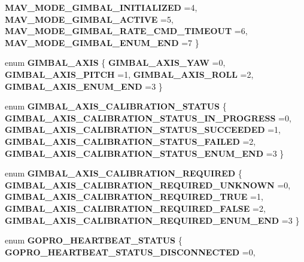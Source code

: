 \begin{DoxyCompactItemize}
\newline
\textbf{ M\+A\+V\+\_\+\+M\+O\+D\+E\+\_\+\+G\+I\+M\+B\+A\+L\+\_\+\+I\+N\+I\+T\+I\+A\+L\+I\+Z\+ED} =4, 
\textbf{ M\+A\+V\+\_\+\+M\+O\+D\+E\+\_\+\+G\+I\+M\+B\+A\+L\+\_\+\+A\+C\+T\+I\+VE} =5, 
\textbf{ M\+A\+V\+\_\+\+M\+O\+D\+E\+\_\+\+G\+I\+M\+B\+A\+L\+\_\+\+R\+A\+T\+E\+\_\+\+C\+M\+D\+\_\+\+T\+I\+M\+E\+O\+UT} =6, 
\textbf{ M\+A\+V\+\_\+\+M\+O\+D\+E\+\_\+\+G\+I\+M\+B\+A\+L\+\_\+\+E\+N\+U\+M\+\_\+\+E\+ND} =7
 \}
\item 
enum \textbf{ G\+I\+M\+B\+A\+L\+\_\+\+A\+X\+IS} \{ \textbf{ G\+I\+M\+B\+A\+L\+\_\+\+A\+X\+I\+S\+\_\+\+Y\+AW} =0, 
\textbf{ G\+I\+M\+B\+A\+L\+\_\+\+A\+X\+I\+S\+\_\+\+P\+I\+T\+CH} =1, 
\textbf{ G\+I\+M\+B\+A\+L\+\_\+\+A\+X\+I\+S\+\_\+\+R\+O\+LL} =2, 
\textbf{ G\+I\+M\+B\+A\+L\+\_\+\+A\+X\+I\+S\+\_\+\+E\+N\+U\+M\+\_\+\+E\+ND} =3
 \}
\item 
enum \textbf{ G\+I\+M\+B\+A\+L\+\_\+\+A\+X\+I\+S\+\_\+\+C\+A\+L\+I\+B\+R\+A\+T\+I\+O\+N\+\_\+\+S\+T\+A\+T\+US} \{ \textbf{ G\+I\+M\+B\+A\+L\+\_\+\+A\+X\+I\+S\+\_\+\+C\+A\+L\+I\+B\+R\+A\+T\+I\+O\+N\+\_\+\+S\+T\+A\+T\+U\+S\+\_\+\+I\+N\+\_\+\+P\+R\+O\+G\+R\+E\+SS} =0, 
\textbf{ G\+I\+M\+B\+A\+L\+\_\+\+A\+X\+I\+S\+\_\+\+C\+A\+L\+I\+B\+R\+A\+T\+I\+O\+N\+\_\+\+S\+T\+A\+T\+U\+S\+\_\+\+S\+U\+C\+C\+E\+E\+D\+ED} =1, 
\textbf{ G\+I\+M\+B\+A\+L\+\_\+\+A\+X\+I\+S\+\_\+\+C\+A\+L\+I\+B\+R\+A\+T\+I\+O\+N\+\_\+\+S\+T\+A\+T\+U\+S\+\_\+\+F\+A\+I\+L\+ED} =2, 
\textbf{ G\+I\+M\+B\+A\+L\+\_\+\+A\+X\+I\+S\+\_\+\+C\+A\+L\+I\+B\+R\+A\+T\+I\+O\+N\+\_\+\+S\+T\+A\+T\+U\+S\+\_\+\+E\+N\+U\+M\+\_\+\+E\+ND} =3
 \}
\item 
enum \textbf{ G\+I\+M\+B\+A\+L\+\_\+\+A\+X\+I\+S\+\_\+\+C\+A\+L\+I\+B\+R\+A\+T\+I\+O\+N\+\_\+\+R\+E\+Q\+U\+I\+R\+ED} \{ \textbf{ G\+I\+M\+B\+A\+L\+\_\+\+A\+X\+I\+S\+\_\+\+C\+A\+L\+I\+B\+R\+A\+T\+I\+O\+N\+\_\+\+R\+E\+Q\+U\+I\+R\+E\+D\+\_\+\+U\+N\+K\+N\+O\+WN} =0, 
\textbf{ G\+I\+M\+B\+A\+L\+\_\+\+A\+X\+I\+S\+\_\+\+C\+A\+L\+I\+B\+R\+A\+T\+I\+O\+N\+\_\+\+R\+E\+Q\+U\+I\+R\+E\+D\+\_\+\+T\+R\+UE} =1, 
\textbf{ G\+I\+M\+B\+A\+L\+\_\+\+A\+X\+I\+S\+\_\+\+C\+A\+L\+I\+B\+R\+A\+T\+I\+O\+N\+\_\+\+R\+E\+Q\+U\+I\+R\+E\+D\+\_\+\+F\+A\+L\+SE} =2, 
\textbf{ G\+I\+M\+B\+A\+L\+\_\+\+A\+X\+I\+S\+\_\+\+C\+A\+L\+I\+B\+R\+A\+T\+I\+O\+N\+\_\+\+R\+E\+Q\+U\+I\+R\+E\+D\+\_\+\+E\+N\+U\+M\+\_\+\+E\+ND} =3
 \}
\item 
enum \textbf{ G\+O\+P\+R\+O\+\_\+\+H\+E\+A\+R\+T\+B\+E\+A\+T\+\_\+\+S\+T\+A\+T\+US} \{ \newline
\textbf{ G\+O\+P\+R\+O\+\_\+\+H\+E\+A\+R\+T\+B\+E\+A\+T\+\_\+\+S\+T\+A\+T\+U\+S\+\_\+\+D\+I\+S\+C\+O\+N\+N\+E\+C\+T\+ED} =0, 

\end{DoxyCompactItemize}
